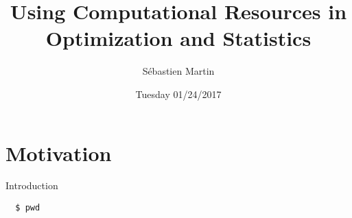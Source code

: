 \documentclass{beamer}
\title[IAP-2017]{Using Computational Resources in Optimization and Statistics}
\author{Sébastien Martin}
\institute{MIT}
\date{Tuesday 01/24/2017}
\begin{document}
\begin{frame}
  \titlepage
\end{frame}


\section{Motivation}

\begin{frame}[fragile]{Introduction}

\begin{verbatim}
  $ pwd
\end{verbatim}

\end{frame}
\end{document}
